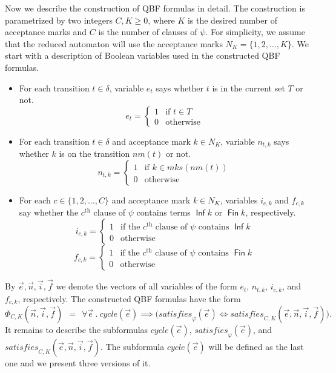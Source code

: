 \documentclass[a4paper,UKenglish,cleveref,autoref,thm-restate]{lipics-v2021}
\DeclareMathOperator{\Inf}{\mathsf{Inf}}
\DeclareMathOperator{\Fin}{\mathsf{Fin}}
\newcommand{\mks}{\mathit{mks}}
\newcommand{\rem}{\mathit{nm}}
\newcommand{\mcycle}{\mathit{cycle}}
\newcommand{\msat}{\mathit{satisfies}}
\begin{document}
Now we describe the construction of QBF formulas in detail. The
construction is parametrized by two integers $C,K\ge 0$, where $K$ is
the desired number of acceptance marks and $C$ is the number of
clauses of $\psi$. For simplicity, we assume that the reduced
automaton will use the acceptance marks $N_K=\{1,2,\ldots,K\}$.
We start with a description of Boolean variables used in the
constructed QBF formulas.
\begin{itemize}
\item For each transition $t\in\delta$, variable $e_t$ says whether
  $t$ is in the current set $T$ or not.
  \[e_t=\left\{
      \begin{array}{ll}
        1 & \textrm{if }t\in T\\
        0 & \textrm{otherwise}    
      \end{array}\right.
  \]
\item For each transition $t\in\delta$ and acceptance mark $k\in N_K$,
  variable $n_{t,k}$ says whether $k$ is on the transition
  $\rem(t)$ or not.
  \[n_{t,k}=\left\{
      \begin{array}{ll}
        1 & \textrm{if }k\in\mks(\rem(t))\\
        0 & \textrm{otherwise}    
      \end{array}\right.
  \]
\item For each $c\in\{1,2,\ldots,C\}$ and acceptance mark $k\in N_K$,
  variables $i_{c,k}$ and $f_{c,k}$ say whether the $c^\textrm{th}$
  clause of $\psi$ contains terms $\Inf k$ or $\Fin k$, respectively.
  \[i_{c,k}=\left\{
      \begin{array}{ll}
        1 & \textrm{if the $c^\textrm{th}$ clause of $\psi$ contains $\Inf k$}\\
        0 & \textrm{otherwise}    
      \end{array}\right.
  \]
  \[f_{c,k}=\left\{
      \begin{array}{ll}
        1 & \textrm{if the $c^\textrm{th}$ clause of $\psi$ contains $\Fin k$}\\
        0 & \textrm{otherwise}    
      \end{array}\right.
  \]

\end{itemize}
By $\vec{e},\vec{n},\vec{i},\vec{f}$ we denote the vectors of all
variables of the form $e_t$, $n_{t,k}$, $i_{c,k}$, and $f_{c,k}$,
respectively. The constructed QBF formulas have the form 
\[
  \Phi_{C,K}(\vec{n},\vec{i},\vec{f})~~=~~\forall \vec{e}~.~\mcycle(\vec{e})\implies\big(\msat_\varphi(\vec{e}) \iff \msat_{C,K}(\vec{e},\vec{n},\vec{i},\vec{f})\big).
\]
It remains to describe the subformulas $\mcycle(\vec{e})$,
$\msat_\varphi(\vec{e})$, and
$\msat_{C,K}(\vec{e},\vec{n},\vec{i},\vec{f})$. The subformula
$\mcycle(\vec{e})$ will be defined as the last one and we present
three versions of it.
\end{document}
